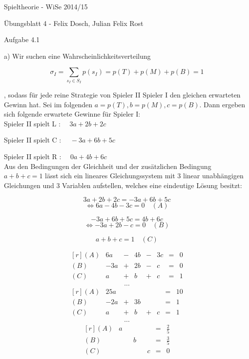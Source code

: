 \documentclass{scrartcl}
\begin{document}
\begin{LARGE}
Spieltheorie - WiSe 2014/15
\end{LARGE}

\begin{Large}
Übungsblatt 4 - Felix Dosch, Julian Felix Rost\\[1.0cm]
\end{Large}

\begin{Large}
Aufgabe 4.1\\[0.0cm]
\end{Large}

a) Wir suchen eine Wahrscheinlichkeitsverteilung 

\[
\sigma_I = \sum_{s_I \in S_I} p(s_I) = p(T) + p(M) + p(B) = 1
\]

, sodass für jede reine Strategie von Spieler II Spieler I den gleichen erwarteten Gewinn
hat. Sei im folgenden $a = p(T), b = p(M), c = p(B)$. Dann ergeben sich folgende erwartete
Gewinne für Spieler I: \\

Spieler II spielt L : $\quad 3a + 2b + 2c$

Spieler II spielt C : $\quad -3a + 6b + 5c$

Spieler II spielt R : $\quad 0a + 4b + 6c$ \\

Aus den Bedingungen der Gleichheit und der zusätzlichen Bedingung $a+b+c = 1$ lässt sich ein
lineares Gleichungssystem mit 3 linear unabhängigen Gleichungen und 3 Variablen aufstellen,
welches eine eindeutige Lösung besitzt:

\[
3a + 2b + 2c = -3a + 6b + 5c
\]
\[
\Leftrightarrow 6a - 4b - 3c = 0 \quad (A)
\]

\[
-3a + 6b + 5c = 4b + 6c
\]
\[
\Leftrightarrow -3a + 2b - c = 0 \quad (B)
\]

\[
a + b + c = 1 \quad (C)
\]

\[
\begin{matrix*}[r]
  (A) & 6a & -&4b & -&3c & = & 0 \\
  (B) & -3a & +&2b & -&c & = & 0 \\
  (C) & a & +&b & +&c & = & 1 \\
\end{matrix*}
\] \[ \cdots \] \[
\begin{matrix*}[r]
  (A) & 25a & & & & & = & 10 \\
  (B) & -2a & +&3b & & & = & 1 \\
  (C) & a & +&b & +&c & = & 1 \\
\end{matrix*}
\] \[ \cdots \] \[
\begin{matrix*}[r]
  (A) & a & & & & & = & \frac{2}{5} \\
  (B) & & & b & & & = & \frac{3}{5} \\
  (C) & & & & & c & = & 0 \\
\end{matrix*}
\]
\end{document}
